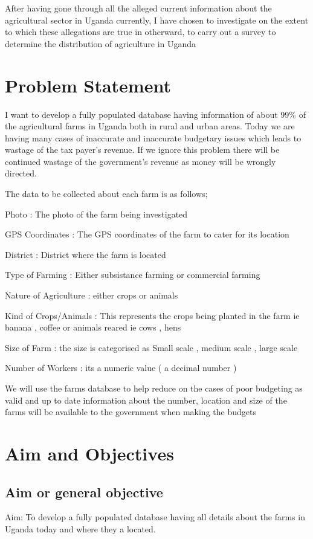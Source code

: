 \documentclass{article}
\begin{document}
After having gone through all the alleged current information about the agricultural sector in Uganda currently, I have chosen to investigate on the extent to which these allegations are true in otherward, to carry out a survey to determine the distribution of agriculture in Uganda   


\section{Problem Statement}\label{sec:problemstatement}


I want to develop a fully populated database having information of about 99\% of the agricultural farms in Uganda both in rural and urban areas. 
Today we are having many cases of inaccurate and inaccurate budgetary issues which leads to wastage of the tax payer’s revenue. If we ignore this problem there will be continued wastage of the government’s revenue as money will be wrongly directed.

The data to be collected about each farm is as follows;

Photo : The photo of the farm being investigated

GPS Coordinates : The GPS coordinates of the farm to cater for its location

District : District where the farm is located

Type of Farming : Either subsistance farming or commercial farming

Nature of Agriculture : either crops or animals

Kind of Crops/Animals : This represents the crops being planted in the farm ie banana , coffee or animals reared ie cows , hens

Size of Farm : the size is categorised as  Small scale , medium scale , large scale

Number of Workers : its a numeric value ( a decimal number )

We will use the farms database to help reduce on the cases of poor budgeting as valid and up to date information about the number, location and size of the farms will be available to the government when making the budgets


\section{Aim and Objectives}\label{sec:aimsandobjectives}
\subsection{Aim or general objective}
Aim:  To develop a fully populated database having all details about the farms in Uganda today and where they a located.
\end{document}
